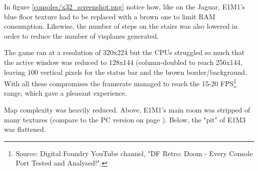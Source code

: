 In figure \ref{consoles/x32_screenshot.png} notice how, like on the Jaguar, E1M1's blue floor texture had to be replaced with a brown one to limit RAM consumption. Likewise, the number of steps on the stairs was also lowered in order to reduce the number of visplanes generated.\\
\par
The game ran at a resolution of 320x224 but the CPUs struggled so much that the active window was reduced to 128x144 (column-doubled to reach 256x144, leaving 100 vertical pixels for the status bar and the brown border/background. With all these compromises the framerate managed to reach the 15-20 FPS\footnote{Source: Digital Foundry YouTube channel, "DF Retro: Doom - Every Console Port Tested and Analysed!".} range, which gave a pleasant experience.\\
\par
{}



\par
Map complexity was heavily reduced. Above, E1M1's main room was stripped of many textures (compare to the PC version on page \pageref{complex_scene_plain_light.png}). Below, the "pit" of E1M3 was flattened.\\
\par
{}






